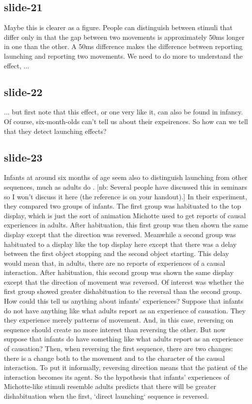 \documentclass[12pt,\papersize]{extarticle}
\begin{document}
 
\subsection{slide-21}
Maybe this is clearer as a figure.
People can distinguish between stimuli that differ only in that the gap between two movements is approximately 50ms longer in one than the other. A 50ms difference makes the difference between reporting launching and reporting two movements.
We need to do more to understand the effect, ...
 
 
\subsection{slide-22}
... but first note that this effect, or one very like it, can also be found in infancy.
Of course, six-month-olds can't tell us about their expeirences. So how can we tell that they detect launching effects?
 
 
\subsection{slide-23}
Infants at around six months of age seem also to distinguish launching from other sequences, much as adults do \citep{Leslie:1987nr}.
[nb: Several people have discussed this in seminars so I won't discuss it here (the reference is on your handout).]
In their experiment, they compared two groups of infants. The first group was habituated to the top display, which is just the sort of animation Michotte used to get reports of causal experiences in adults. After habituation, this first group was then shown the same display except that the direction was reversed. Meanwhile a second group was habituated to a display like the top display here except that there was a delay between the first object stopping and the second object starting. This delay would mean that, in adults, there are no reports of experiences of a causal interaction. After habituation, this second group was shown the same display except that the direction of movement was reversed.
Of interest was whether the first group showed greater dishabituation to the reversal than the second group. How could this tell us anything about infants' experiences? Suppose that infants do not have anything like what adults report as an experience of causation. They they experience merely patterns of movement. And, in this case, reversing on sequence should create no more interest than reversing the other. But now suppose that infants do have something like what adults report as an experience of causation? Then, when reversing the first sequence, there are two changes: there is a change both to the movement and to the character of the causal interaction. To put it informally, reversing direction means that the patient of the interaction becomes its agent. So the hypothesis that infants' experiences of Michotte-like stimuli resemble adults predicts that there will be greater dishabituation when the first, `direct launching` sequence is reversed.
 
\end{document}
